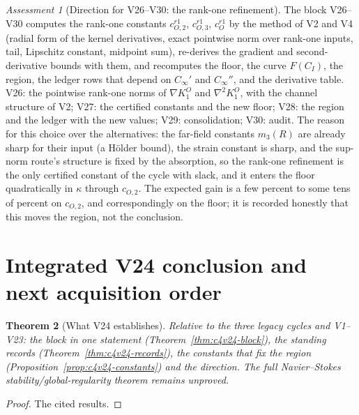 \documentclass[11pt]{article}
\theoremstyle{plain}
\newtheorem{theorem}{Theorem}[section]
\theoremstyle{definition}
\theoremstyle{remark}
\newtheorem{assessment}[theorem]{Assessment}
\begin{document}
\begin{assessment}[Direction for V26--V30: the rank-one refinement]
\label{ass:c4v24-direction}
The block V26--V30 computes the rank-one constants \(c_{O,2}^{r1}\), \(c_{O,3}^{r1}\), \(c_O^{r1}\)
by the method of V2 and V4 (radial form of the kernel derivatives,
exact pointwise norm over rank-one inputs, tail, Lipschitz constant,
midpoint sum), re-derives the gradient and second-derivative bounds
with them, and recomputes the floor, the curve \(F(C_I)\), the region, the
ledger rows that depend on \(C_\infty'\) and \(C_\infty''\), and the derivative table.
V26: the pointwise rank-one norms of \(\nabla K^O_1\) and \(\nabla^2K^O_1\), with the
channel structure of V2; V27: the certified constants and the new
floor; V28: the region and the ledger with the new values; V29:
consolidation; V30: audit.  The reason for this choice over the
alternatives: the far-field constants \(m_3(R)\) are already sharp for
their input (a Hölder bound), the strain constant is sharp, and the
sup-norm route's structure is fixed by the absorption, so the
rank-one refinement is the only certified constant of the cycle
with slack, and it enters the floor quadratically in \(\kappa\) through
\(c_{O,2}\).  The expected gain is a few percent to some tens of percent on
\(c_{O,2}\), and correspondingly on the floor; it is recorded honestly
that this moves the region, not the conclusion.
\end{assessment}

\section{Integrated V24 conclusion and next acquisition order}
\label{sec:c4v24-conclusion}

\begin{theorem}[What V24 establishes]
\label{thm:c4v24-conclusion}
Relative to the three legacy cycles and V1--V23: the block in one
statement (Theorem~\ref{thm:c4v24-block}), the standing records
(Theorem~\ref{thm:c4v24-records}), the constants that fix the region
(Proposition~\ref{prop:c4v24-constants}) and the direction.  The full
Navier--Stokes stability/global-regularity theorem remains
unproved.
\end{theorem}

\begin{proof}
The cited results.
\end{proof}
\end{document}

